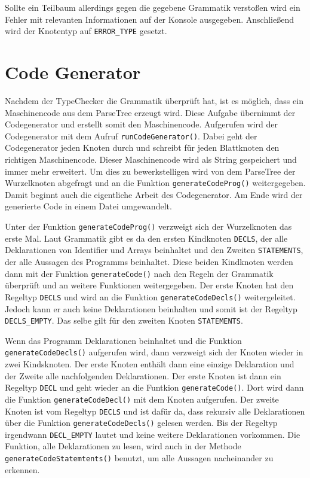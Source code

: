 Sollte ein Teilbaum allerdings gegen die gegebene Grammatik verstoßen wird ein Fehler mit relevanten Informationen auf der Konsole ausgegeben. Anschließend wird der Knotentyp auf \texttt{ERROR\_TYPE} gesetzt.

\section{Code Generator}
Nachdem der TypeChecker die Grammatik überprüft hat, ist es möglich, dass ein Maschinencode aus dem ParseTree erzeugt wird. Diese Aufgabe übernimmt der Codegenerator und erstellt somit den Maschinencode. Aufgerufen wird der Codegenerator mit dem Aufruf \texttt{runCodeGenerator()}. Dabei geht der Codegenerator jeden Knoten durch und schreibt für jeden Blattknoten den richtigen Maschinencode. Dieser Maschinencode wird als String gespeichert und immer mehr erweitert. Um dies zu bewerkstelligen wird von dem ParseTree der Wurzelknoten abgefragt und an die Funktion \texttt{generateCodeProg()} weitergegeben. Damit beginnt auch die eigentliche Arbeit des Codegenerator. Am Ende wird der generierte Code in einem Datei umgewandelt.



Unter der Funktion \texttt{generateCodeProg()} verzweigt sich der Wurzelknoten das erste Mal.  Laut Grammatik gibt es da den ersten Kindknoten \texttt{DECLS}, der alle Deklarationen von Identifier und Arrays beinhaltet und den Zweiten \texttt{STATEMENTS}, der alle Aussagen des Programms beinhaltet. Diese beiden Kindknoten werden dann mit der Funktion \texttt{generateCode()} nach den Regeln der Grammatik überprüft und an weitere Funktionen weitergegeben. Der erste Knoten hat den Regeltyp \texttt{DECLS} und wird an die Funktion \texttt{generateCodeDecls()} weitergeleitet. Jedoch kann er auch keine Deklarationen beinhalten und somit ist der  Regeltyp \texttt{DECLS\_EMPTY}. Das selbe gilt für den zweiten Knoten \texttt{STATEMENTS}.



Wenn das Programm Deklarationen beinhaltet und die Funktion \texttt{generateCodeDecls()} aufgerufen wird, dann verzweigt sich der Knoten wieder in zwei Kindsknoten. Der erste Knoten enthält dann eine einzige Deklaration und der Zweite alle nachfolgenden Deklarationen. Der erste Knoten ist dann ein Regeltyp \texttt{DECL} und geht wieder an die Funtkion \texttt{generateCode()}. Dort wird dann die Funktion \texttt{generateCodeDecl()} mit dem Knoten aufgerufen. Der zweite Knoten ist vom Regeltyp \texttt{DECLS} und ist dafür da, dass rekursiv alle Deklarationen über die Funktion \texttt{generateCodeDecls()} gelesen werden. Bis der Regeltyp irgendwann \texttt{DECL\_EMPTY} lautet und keine weitere Deklarationen vorkommen. Die Funktion, alle Deklarationen zu lesen, wird auch in der Methode \texttt{generateCodeStatemtents()} benutzt, um alle Aussagen nacheinander zu erkennen.

